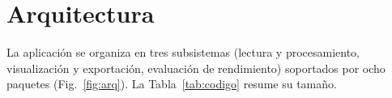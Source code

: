 \section{Arquitectura}
La aplicación se organiza en tres subsistemas (lectura y procesamiento, visualización y exportación, evaluación de rendimiento) soportados por ocho paquetes (Fig.~\ref{fig:arq}). La Tabla~\ref{tab:codigo} resume su tamaño.


